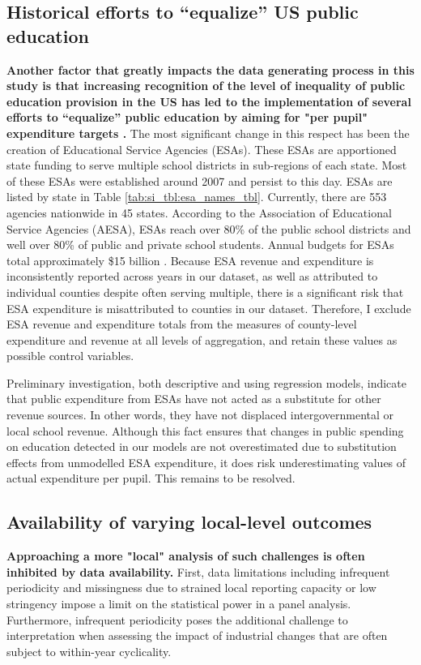 \subsection{Historical efforts to ``equalize'' US public education}
\textbf{Another factor that greatly impacts the data generating process in this study is that increasing recognition of the level of inequality of public education provision in the US has led to the implementation of several efforts to ``equalize'' public education by aiming for "per pupil" expenditure targets \parencite{skinner_state_2019}.} The most significant change in this respect has been the creation of Educational Service Agencies (ESAs). These ESAs are apportioned state funding to serve multiple school districts in sub-regions of each state. Most of these ESAs were established around 2007 and persist to this day. ESAs are listed by state in Table \ref{tab:si_tbl:esa_names_tbl}. Currently, there are 553 agencies nationwide in 45 states. According to the Association of Educational Service Agencies (AESA), ESAs reach over 80\% of the public school districts and well over 80\% of public and private school students. Annual budgets for ESAs total approximately \$15 billion \parencite{aesa_about_2024}. Because ESA revenue and expenditure is inconsistently reported across years in our dataset, as well as attributed to individual counties despite often serving multiple, there is a significant risk that ESA expenditure is misattributed to counties in our dataset. Therefore, I exclude ESA revenue and expenditure totals from the measures of county-level expenditure and revenue at all levels of aggregation, and retain these values as possible control variables.

Preliminary investigation, both descriptive and using regression models, indicate that public expenditure from ESAs have not acted as a substitute for other revenue sources. In other words, they have not displaced intergovernmental or local school revenue. Although this fact ensures that changes in public spending on education detected in our models are not overestimated due to substitution effects from unmodelled ESA expenditure, it does risk underestimating values of actual expenditure per pupil. This remains to be resolved.

\subsection{Availability of varying local-level outcomes}

\textbf{Approaching a more "local" analysis of such challenges is often inhibited by data availability.} First, data limitations including infrequent periodicity and missingness due to strained local reporting capacity or low stringency impose a limit on the statistical power in a panel analysis. Furthermore, infrequent periodicity poses the additional challenge to interpretation when assessing the impact of industrial changes that are often subject to within-year cyclicality. 

